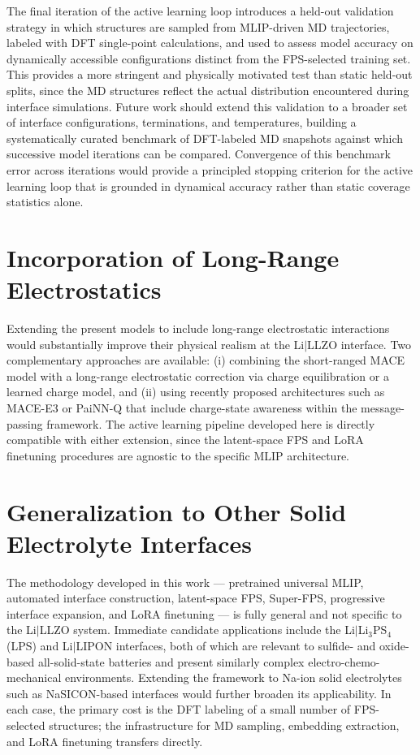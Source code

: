 \documentclass[12pt,a4paper,oneside]{book}
\begin{document}
The final iteration of the active learning loop introduces a held-out validation
strategy in which structures are sampled from MLIP-driven MD trajectories, labeled
with DFT single-point calculations, and used to assess model accuracy on
dynamically accessible configurations distinct from the FPS-selected training set.
This provides a more stringent and physically motivated test than static held-out
splits, since the MD structures reflect the actual distribution encountered during
interface simulations. Future work should extend this validation to a broader set
of interface configurations, terminations, and temperatures, building a
systematically curated benchmark of DFT-labeled MD snapshots against which
successive model iterations can be compared. Convergence of this benchmark error
across iterations would provide a principled stopping criterion for the active
learning loop that is grounded in dynamical accuracy rather than static coverage
statistics alone.
\section{Incorporation of Long-Range Electrostatics}

Extending the present models to include long-range electrostatic interactions would
substantially improve their physical realism at the Li$|$LLZO interface. Two
complementary approaches are available: (i) combining the short-ranged MACE model
with a long-range electrostatic correction via charge equilibration or a learned
charge model, and (ii) using recently proposed architectures such as MACE-E3 or
PaiNN-Q that include charge-state awareness within the message-passing framework.
The active learning pipeline developed here is directly compatible with either
extension, since the latent-space FPS and LoRA finetuning procedures are agnostic
to the specific MLIP architecture.

\section{Generalization to Other Solid Electrolyte Interfaces}

The methodology developed in this work --- pretrained universal MLIP, automated
interface construction, latent-space FPS, Super-FPS, progressive interface expansion,
and LoRA finetuning --- is fully general and not specific to the Li$|$LLZO system. Immediate candidate applications
include the Li$|$Li$_3$PS$_4$ (LPS) and Li$|$LIPON interfaces, both of which are
relevant to sulfide- and oxide-based all-solid-state batteries and present similarly
complex electro-chemo-mechanical environments. Extending the framework to Na-ion
solid electrolytes such as NaSICON-based interfaces would further broaden its
applicability. In each case, the primary cost is the DFT labeling of a small number
of FPS-selected structures; the infrastructure for MD sampling, embedding extraction,
and LoRA finetuning transfers directly.
\end{document}
